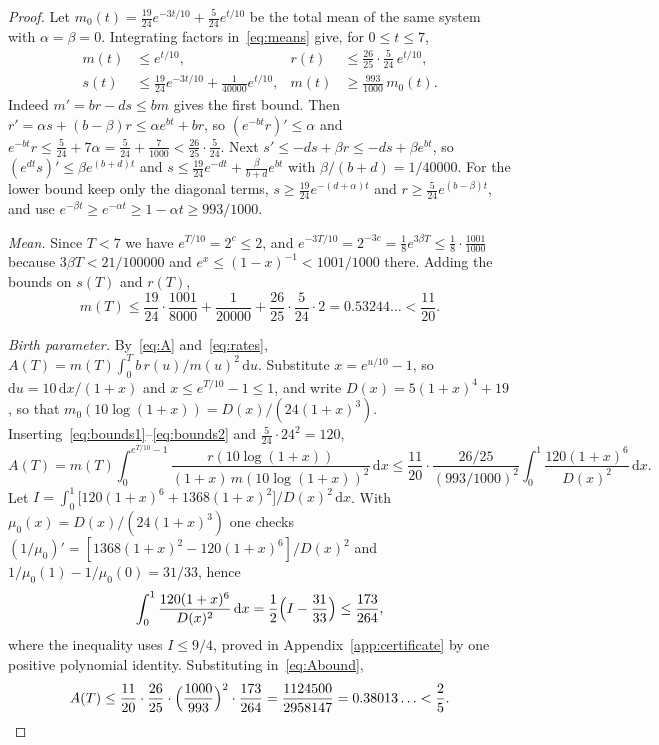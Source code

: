 \documentclass[11pt,a4paper]{article}
\theoremstyle{plain}
\theoremstyle{definition}
\theoremstyle{remark}
\newcommand{\dd}{\mathrm d}
\begin{document}
\begin{proof}
Let $m_0(t)=\frac{19}{24}e^{-3t/10}+\frac5{24}e^{t/10}$ be the total mean of the same system with $\alpha=\beta=0$. Integrating factors in~\eqref{eq:means} give, for $0\le t\le7$,
\begin{align}
m(t)&\le e^{t/10}, & r(t)&\le\frac{26}{25}\cdot\frac5{24}\,e^{t/10},\label{eq:bounds1}\\
s(t)&\le\frac{19}{24}e^{-3t/10}+\frac1{40000}e^{t/10}, & m(t)&\ge\frac{993}{1000}\,m_0(t).\label{eq:bounds2}
\end{align}
Indeed $m'=br-ds\le bm$ gives the first bound. Then $r'=\alpha s+(b-\beta)r\le\alpha e^{bt}+br$, so $(e^{-bt}r)'\le\alpha$ and $e^{-bt}r\le\frac5{24}+7\alpha=\frac5{24}+\frac7{1000}<\frac{26}{25}\cdot\frac5{24}$. Next $s'\le-ds+\beta r\le-ds+\beta e^{bt}$, so $(e^{dt}s)'\le\beta e^{(b+d)t}$ and $s\le\frac{19}{24}e^{-dt}+\frac{\beta}{b+d}e^{bt}$ with $\beta/(b+d)=1/40000$. For the lower bound keep only the diagonal terms, $s\ge\frac{19}{24}e^{-(d+\alpha)t}$ and $r\ge\frac5{24}e^{(b-\beta)t}$, and use $e^{-\beta t}\ge e^{-\alpha t}\ge1-\alpha t\ge993/1000$.

\emph{Mean.} Since $T<7$ we have $e^{T/10}=2^{c}\le2$, and $e^{-3T/10}=2^{-3c}=\frac18e^{3\beta T}\le\frac18\cdot\frac{1001}{1000}$ because $3\beta T<21/100000$ and $e^x\le(1-x)^{-1}<1001/1000$ there. Adding the bounds on $s(T)$ and $r(T)$,
\[
m(T)\le\frac{19}{24}\cdot\frac{1001}{8000}+\frac1{20000}+\frac{26}{25}\cdot\frac5{24}\cdot2=0.53244\ldots<\frac{11}{20}.
\]

\emph{Birth parameter.} By~\eqref{eq:A} and~\eqref{eq:rates}, $A(T)=m(T)\int_0^T b\,r(u)/m(u)^2\,\dd u$. Substitute $x=e^{u/10}-1$, so $\dd u=10\,\dd x/(1+x)$ and $x\le e^{T/10}-1\le1$, and write $D(x)=5(1+x)^4+19$, so that $m_0(10\log(1+x))=D(x)/(24(1+x)^3)$. Inserting~\eqref{eq:bounds1}--\eqref{eq:bounds2} and $\frac5{24}\cdot24^2=120$,
\begin{equation}\label{eq:Abound}
A(T)=m(T)\int_0^{e^{T/10}-1}\frac{r(10\log(1+x))}{(1+x)\,m(10\log(1+x))^2}\,\dd x
\le\frac{11}{20}\cdot\frac{26/25}{(993/1000)^2}\int_0^1\frac{120(1+x)^6}{D(x)^2}\,\dd x .
\end{equation}
Let $I=\int_0^1\bigl[120(1+x)^6+1368(1+x)^2\bigr]/D(x)^2\,\dd x$. With $\mu_0(x)=D(x)/(24(1+x)^3)$ one checks $(1/\mu_0)'=[1368(1+x)^2-120(1+x)^6]/D(x)^2$ and $1/\mu_0(1)-1/\mu_0(0)=31/33$, hence
\[
\int_0^1\frac{120(1+x)^6}{D(x)^2}\,\dd x=\frac12\Bigl(I-\frac{31}{33}\Bigr)\le\frac{173}{264},
\]
where the inequality uses $I\le 9/4$, proved in Appendix~\ref{app:certificate} by one positive polynomial identity. Substituting in~\eqref{eq:Abound},
\[
A(T)\le\frac{11}{20}\cdot\frac{26}{25}\cdot\Bigl(\frac{1000}{993}\Bigr)^2\cdot\frac{173}{264}=\frac{1124500}{2958147}=0.38013\ldots<\frac25 . \qedhere
\]
\end{proof}
\end{document}
